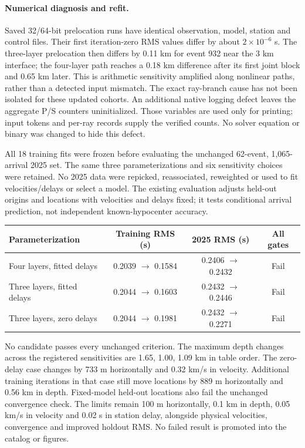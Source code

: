 \paragraph{Numerical diagnosis and refit.}
Saved 32/64-bit prelocation runs have identical observation, model, station and
control files. Their first iteration-zero RMS values differ by about
$2\times10^{-6}$ s. The three-layer prelocation then differs by 0.11 km for
event 932 near the 3 km interface; the four-layer path reaches a 0.18 km
difference after its first joint block and 0.65 km later. This is arithmetic
sensitivity amplified along nonlinear paths, rather than a detected input mismatch.
The exact ray-branch cause has not been isolated for these updated cohorts.
An additional native logging defect leaves the aggregate P/S counters
uninitialized. Those variables are used only for printing; input tokens and
per-ray records supply the verified counts. No solver equation or binary was
changed to hide this defect.

All 18 training fits were frozen before evaluating the unchanged 62-event,
1,065-arrival 2025 set. The same three parameterizations and six sensitivity
choices were retained. No 2025 data were repicked, reassociated, reweighted or
used to fit velocities/delays or select a model. The existing evaluation adjusts
held-out origins and locations with velocities and delays fixed; it tests
conditional arrival prediction, not independent known-hypocenter accuracy.
\begin{center}\small\begin{tabular}{lccc}\toprule
Parameterization & Training RMS (s) & 2025 RMS (s) & All gates\\\midrule
Four layers, fitted delays & 0.2039 $\to$ 0.1584 & 0.2406 $\to$ 0.2432 & Fail \\
Three layers, fitted delays & 0.2044 $\to$ 0.1603 & 0.2432 $\to$ 0.2446 & Fail \\
Three layers, zero delays & 0.2044 $\to$ 0.1981 & 0.2432 $\to$ 0.2271 & Fail \\
\bottomrule\end{tabular}\end{center}
No candidate passes every unchanged criterion. The maximum depth changes across
the registered sensitivities are 1.65, 1.00, 1.09 km in table order.
The zero-delay case changes by 733 m horizontally and 0.32 km/s in velocity.
Additional training iterations in that case still move locations by 889 m horizontally and 0.56 km in depth.
Fixed-model held-out locations also fail the unchanged convergence check.
The limits remain 100 m horizontally, 0.1 km in depth, 0.05 km/s in velocity
and 0.02 s in station delay, alongside physical velocities, convergence and
improved holdout RMS. No failed result is promoted into the catalog or figures.

